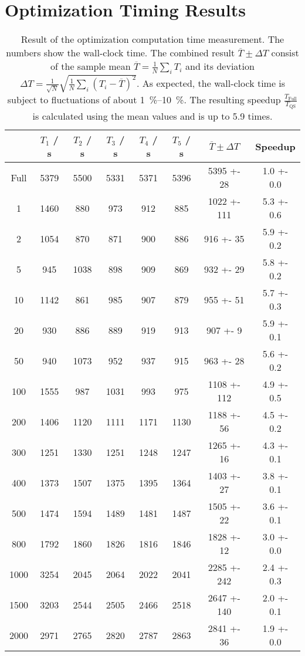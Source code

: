 \section*{Optimization Timing Results}
\begin{table}
	\centering
	\begin{tabular}{ 
			S[table-format=4] 
			S[table-format=4] 
			S[table-format=4] 
			S[table-format=4] 
			S[table-format=4]  
			S[table-format=4] 
			S[table-format=4(2)] 
			S[table-format=1.1(1)]
		}
		\toprule
		\paramregions & {$T_1$ / \si{\second}} &  {$T_2$ / \si{\second}} & {$T_3$ / \si{\second}} & {$T_4$ / \si{\second}} & {$T_5$ / \si{\second}} & {$\overline{T} \pm \Delta T$} & {Speedup} \\
		\midrule
		{Full} & 5379 & 5500 & 5331 & 5371 & 5396 & 5395 +- 28 & 1.0 +- 0.0 \\ 
		 & 1460 & 880 & 973 & 912 & 885 & 1022 +- 111 & 5.3 +- 0.6 \\ 
		2 & 1054 & 870 & 871 & 900 & 886 & 916 +- 35 & 5.9 +- 0.2 \\ 
		5 & 945 & 1038 & 898 & 909 & 869 & 932 +- 29 & 5.8 +- 0.2 \\ 
		10 & 1142 & 861 & 985 & 907 & 879 & 955 +- 51 & 5.7 +- 0.3 \\ 
		20 & 930 & 886 & 889 & 919 & 913 & 907 +- 9 & 5.9 +- 0.1 \\ 
		50 & 940 & 1073 & 952 & 937 & 915 & 963 +- 28 & 5.6 +- 0.2 \\ 
		100 & 1555 & 987 & 1031 & 993 & 975 & 1108 +- 112 & 4.9 +- 0.5 \\ 
		200 & 1406 & 1120 & 1111 & 1171 & 1130 & 1188 +- 56 & 4.5 +- 0.2 \\ 
		300 & 1251 & 1330 & 1251 & 1248 & 1247 & 1265 +- 16 & 4.3 +- 0.1 \\ 
		400 & 1373 & 1507 & 1375 & 1395 & 1364 & 1403 +- 27 & 3.8 +- 0.1 \\ 
		500 & 1474 & 1594 & 1489 & 1481 & 1487 & 1505 +- 22 & 3.6 +- 0.1 \\ 
		800 & 1792 & 1860 & 1826 & 1816 & 1846 & 1828 +- 12 & 3.0 +- 0.0 \\ 
		1000 & 3254 & 2045 & 2064 & 2022 & 2041 & 2285 +- 242 & 2.4 +- 0.3 \\ 
		1500 & 3203 & 2544 & 2505 & 2466 & 2518 & 2647 +- 140 & 2.0 +- 0.1 \\ 
		2000 & 2971 & 2765 & 2820 & 2787 & 2863 & 2841 +- 36 & 1.9 +- 0.0 \\ 
		\bottomrule
	\end{tabular}
	\caption{Result of the optimization computation time measurement. The numbers show the wall-clock time. The combined result $\overline{T} \pm \Delta T$ consist of the sample mean ${\overline{T} = \frac{1}{N} \sum_i T_i}$ and its deviation ${\Delta T = \frac{1}{\sqrt{N}} \sqrt{\frac{1}{N} \sum_i (T_i - \overline{T})^2}}$. As expected, the wall-clock time is subject to fluctuations of about \SIrange{1}{10}{\percent}. The resulting speedup $\frac{T_{\textrm{Full}}}{T_{\textrm{QS}}}$ is calculated using the mean values and is up to 5.9 times.}
	\label{tbl:timing_results}
\end{table}
